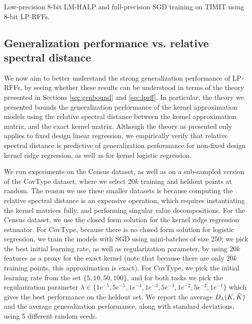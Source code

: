 \begin{table}[ht]
\begin{minipage}{0.375\linewidth}
	\caption{Low-precision 8-bit LM-HALP and full-precision SGD training on TIMIT using 8-bit LP-RFFs.}	
	\label{fig:halp}
\end{minipage}
\end{table}

\vsp
\subsection{Generalization performance vs. relative spectral distance}
\label{subsec:perf_vs_rel_spec_dist}
We now aim to better understand the strong generalization performance of LP-RFFs, by seeing whether these results can be understood in terms of the theory presented in Sections \ref{sec:genbound} and \ref{sec:lprff}.  In particular, the theory we presented bounds the generalization performance of the kernel approximation models using the relative spectral distance between the kernel approximation matrix, and the exact kernel matrix.  Although the theory as presented only applies to fixed design linear regression, we empirically verify that relative spectral distance is predictive of generalization performance for non-fixed design kernel ridge regression, as well as for kernel logistic regression.

We run experiments on the Census dataset, as well as on a sub-sampled version of the CovType dataset, where we select $20k$ training and heldout points at random.  The reason we use these smaller datasets is because computing the relative spectral distance is an expensive operation, which requires instantiating the kernel matrices fully, and performing singular value decompositions. For the Census dataset, we use the closed form solution for the kernel ridge regression estimator.  For CovType, because there is no closed form solution for logistic regression, we train the models with SGD using mini-batches of size 250; we pick the best initial learning rate, as well as regularization parameter, by using $20k$ \Nystrom features as a proxy for the exact kernel (note that because there are only $20k$ training points, this \Nystrom approximation is exact). For CovType, we pick the initial learning rate from the set $\{5, 10, 50, 100\}$, and for both tasks we pick the regularization parameter $\lambda \in \{1e^{-5}, 5e^{-5}, 1e^{-4}, 1e^{-3}, 5e^{-3}, 1e^{-2}, 5e^{-2}, 1e^{-1}\}$ which gives the best performance on the heldout set. We report the average $D_{\lambda}(K,\tilde{K})$ and the average generalization performance, along with standard deviations, using 5 different random seeds.

